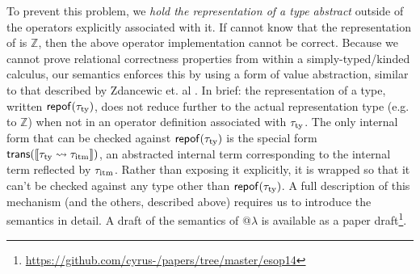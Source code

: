 To prevent this problem, we \emph{hold the representation of a type abstract} outside of the operators explicitly associated with it. If  cannot know that the representation of  is $\mathbb{Z}$, then the above operator implementation cannot be correct. Because we cannot prove relational correctness properties from within a simply-typed/kinded calculus, our semantics enforces this by using a form of value abstraction, similar to that described by Zdancewic et. al \cite{zdancewic}. In brief: the representation of a type, written ${\sf repof}({\tau_{\text{ty}}})$, does not reduce further to the actual representation type (e.g. to $\mathbb{Z}$) when not in an operator definition associated with ${\tau_{\text{ty}}}$. The only internal form that can be checked against  ${\sf repof}({\tau_{\text{ty}}})$ is the special form ${\sf trans}(\llbracket {\tau_{\text{ty}}} \leadsto {\tau_{\text{itm}}} \rrbracket)$, an abstracted internal term corresponding to the internal term reflected by ${\tau_{\text{itm}}}$. Rather than exposing it explicitly, it is wrapped so that it can't be checked against any type other than ${\sf repof}({\tau_{\text{ty}}})$. A full description of this mechanism (and the others, described above) requires us to introduce the semantics in detail. A draft of the semantics of @$\lambda$ is available as a paper draft\footnote{\url{https://github.com/cyrus-/papers/tree/master/esop14}}.

